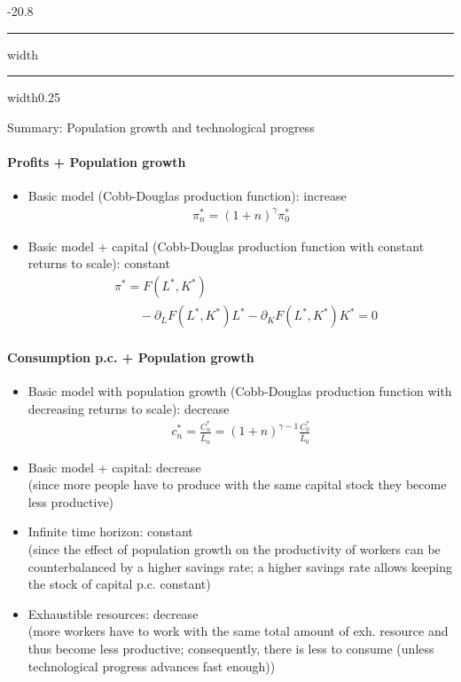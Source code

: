 \documentclass[a4paper,landscape,7pt,fleqn]{scrartcl}
\makeatletter
\renewcommand{\subsection}{\@startsection{subsection}{1}{0mm}%
{-2\baselineskip}{0.8\baselineskip}%
{\hrule depth 0.2pt width\columnwidth\hrule depth0.75pt
width0.25\columnwidth\vspace*{1.2em}\large\bfseries}}
\makeatother
\begin{document}
\begin{multicols*}{3}
\subsection{Summary: Population growth and technological progress}

\paragraph{Profits + Population growth}
\begin{itemize}
\item Basic model (Cobb-Douglas production function): increase
\begin{align*}
\pi_n^\ast = (1+n)^\gamma \pi_0^\ast
\end{align*}
\item Basic model + capital (Cobb-Douglas production function with constant returns to scale): constant
\begin{align*}
& \pi^\ast = F(L^\ast,K^\ast) \\
& \qquad - \partial_L F(L^\ast,K^\ast)L^\ast - \partial_K F(L^\ast,K^\ast) K^\ast = 0
\end{align*}
\end{itemize}

\paragraph{Consumption p.c. + Population growth}
\begin{itemize}
\item Basic model with population growth (Cobb-Douglas production function with decreasing returns to scale): decrease
\begin{align*}
c_n^\ast = \frac{C_n^\ast}{\bar L_n} = (1+n)^{\gamma-1} \frac{C_0^\ast}{\bar L_0}
\end{align*}
\item Basic model + capital: decrease \\
(since more people have to produce with the same capital stock they become less productive)
\item Infinite time horizon: constant \\
(since the effect of population growth on the productivity of workers can be counterbalanced by a higher savings rate; a higher savings rate allows keeping the stock of capital p.c. constant)
\item Exhaustible resources: decrease \\
(more workers have to work with the same total amount of exh. resource and thus become less productive; consequently, there is less to consume (unless technological progress advances fast enough))
\end{itemize}


\end{multicols*}
\end{document}
